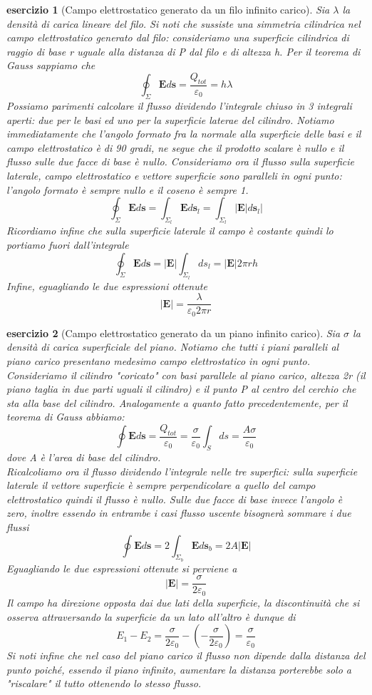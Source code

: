 \documentclass[10pt,a4paper]{article}
\newtheorem{esercizio}{esercizio}
\begin{document}
\begin{esercizio}[Campo elettrostatico generato da un filo infinito carico]
Sia $\lambda$ la densità di carica lineare del filo. Si noti che sussiste una simmetria cilindrica nel campo elettrostatico generato dal filo: consideriamo una superficie cilindrica di raggio di base r uguale alla distanza di P dal filo e di altezza h. Per il teorema di Gauss sappiamo che
\[\oint_{\Sigma}\mathbf{E}d\mathbf{s}=\frac{Q_{tot}}{\varepsilon_0} = h\lambda\]
Possiamo parimenti calcolare il flusso dividendo l'integrale chiuso in 3 integrali aperti: due per le basi ed uno per la superficie laterae del cilindro. Notiamo immediatamente che l'angolo formato fra la normale alla superficie delle basi e il campo elettrostatico è di 90 gradi, ne segue che il prodotto scalare è nullo e il flusso sulle due facce di base è nullo. Consideriamo ora il flusso sulla superficie laterale, campo elettrostatico e vettore superficie sono paralleli in ogni punto: l'angolo formato è sempre nullo e il coseno è sempre 1.
\[\oint_{\Sigma}\mathbf{E}d\mathbf{s}=\int_{\Sigma_l}\mathbf{E}d\mathbf{s}_l= \int_{\Sigma_l}|\mathbf{E}|d\mathbf{s}_l|\]
Ricordiamo infine che sulla superficie laterale il campo è costante quindi lo portiamo fuori dall'integrale
\[\oint_{\Sigma}\mathbf{E}d\mathbf{s}=|\mathbf{E}|\int_{\Sigma_l}ds_l=|\mathbf{E}|2\pi r h\]
Infine, eguagliando le due espressioni ottenute
\[|\mathbf{E}|= \frac{\lambda}{\varepsilon_0 2\pi r }\]
\end{esercizio}
\begin{esercizio}[Campo elettrostatico generato da un piano infinito carico]\label{es:campo_piano_infinito}
Sia $\sigma$ la densità di carica superficiale del piano. Notiamo che tutti i piani paralleli al piano carico presentano medesimo campo elettrostatico in ogni punto. Consideriamo il cilindro "coricato" con basi parallele al piano carico, altezza 2r (il piano taglia in due parti uguali il cilindro) e il punto P al centro del cerchio che sta alla base del cilindro. Analogamente a quanto fatto precedentemente, per il teorema di Gauss abbiamo:
\[\oint\mathbf{E}d\mathbf{s} = \frac{Q_{tot}}{\varepsilon_0}=\frac{\sigma}{\varepsilon_0}\int_Sds=\frac{A\sigma}{\varepsilon_0}\]
dove A è l'area di base del cilindro.\\
Ricalcoliamo ora il flusso dividendo l'integrale nelle tre superfici: sulla superficie laterale il vettore superficie è sempre perpendicolare a quello del campo elettrostatico quindi il flusso è nullo. Sulle due facce di base invece l'angolo è zero, inoltre essendo in entrambe i casi flusso uscente bisognerà sommare i due flussi
  \[\oint\mathbf{E}d\mathbf{s} = 2\int_{\Sigma_b}\mathbf{E}d\mathbf{s}_b= 2A|\mathbf{E}|\]
Eguagliando le due espressioni ottenute si perviene a 
\[|\mathbf{E}|=\frac{\sigma}{2\varepsilon_0}\]
Il campo ha direzione opposta dai due lati della superficie, la discontinuità che si osserva attraversando la superficie da un lato all'altro è dunque di
\[E_1-E_2 = \frac{\sigma}{2\varepsilon_0}-\left(-\frac{\sigma}{2\varepsilon_0}\right) = \frac{\sigma}{\varepsilon_0}\]
Si noti infine che nel caso del piano carico il flusso non dipende dalla distanza del punto poiché, essendo il piano infinito, aumentare la distanza porterebbe solo a "riscalare" il tutto ottenendo lo stesso flusso.
\end{esercizio}
\end{document}
